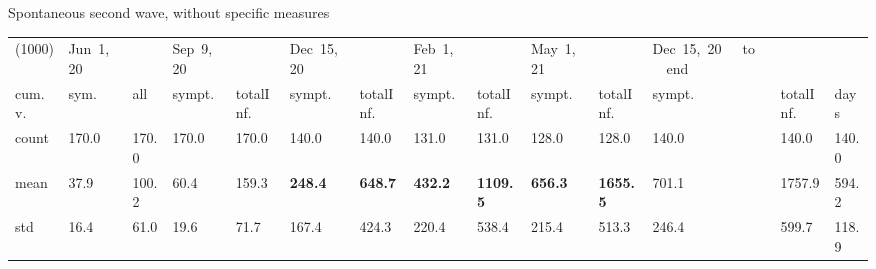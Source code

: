 \documentclass[9pt]{beamer}
\begin{document}
\begin{frame}{Spontaneous second wave, without specific measures}
\begin{table}[H]
\center
\tiny
\begin{tabular}{p{0.4cm}p{0.3cm}p{0.3cm}p{0.3cm}p{0.3cm}p{0.3cm}p{0.3cm}p{0.3cm}p{0.3cm}p{0.3cm}p{0.3cm}p{0.3cm}p{0.3cm}p{0.4cm}}
\toprule
(1000) &  Jun~1,~20 & &  Sep~9,~20 & & Dec~15,~20 & & Feb~1,~21 & & May~1,~21 & & Dec~15,~20~~~to~~~end  \\
cum.~v. &  sym. &  all &  sympt. &  totalInf. &  sympt. &  totalInf. &  sympt. &  totalInf. &  sympt. &  totalInf. &  sympt. &  totalInf.  & days\\
\midrule
count &    170.0 &                      170.0 &    170.0 &                      170.0 &    140.0 &                      140.0 &    131.0 &                      131.0 &    128.0 &                      128.0 &               140.0 &                   140.0 &  140.0 \\
mean  &     37.9 &                      100.2 &     60.4 &                      159.3 &    \textbf{248.4} &                      \textbf{648.7} &    \textbf{432.2} &                     \textbf{1109.5} &   \textbf{656.3} &                     \textbf{1655.5} &              701.1 &                  1757.9 &  594.2 \\
std   &     16.4 &                       61.0 &     19.6 &                       71.7 &    167.4 &                      424.3 &    220.4 &                      538.4 &    215.4 &                      513.3 &               246.4 &                   599.7 &  118.9 \\
\bottomrule
\end{tabular}

\label{selSpontWave2Tab}
\end{table}


\end{frame}
\end{document}
